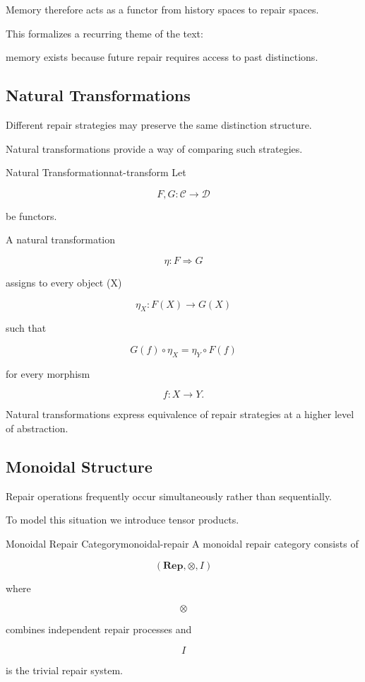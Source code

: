 \documentclass[12pt,twoside,openright]{book}
\begin{document}
Memory therefore acts as a functor from history spaces to
repair spaces.

This formalizes a recurring theme of the text:

memory exists because future repair requires access to
past distinctions.

\subsection{Natural Transformations}

Different repair strategies may preserve the same
distinction structure.

Natural transformations provide a way of comparing such
strategies.

\begin{definition}{Natural Transformation}{nat-transform}
Let

\[
F,G:\mathcal C\rightarrow\mathcal D
\]

be functors.

A natural transformation

\[
\eta:F\Rightarrow G
\]

assigns to every object (X)

\[
\eta_X:F(X)\rightarrow G(X)
\]

such that

\[
G(f)\circ\eta_X
=

\eta_Y\circ F(f)
\]

for every morphism

\[
f:X\rightarrow Y.
\]
\end{definition}

Natural transformations express equivalence of repair
strategies at a higher level of abstraction.

\subsection{Monoidal Structure}

Repair operations frequently occur simultaneously rather
than sequentially.

To model this situation we introduce tensor products.

\begin{definition}{Monoidal Repair Category}{monoidal-repair}
A monoidal repair category consists of

\[
(\mathbf{Rep},\otimes,I)
\]

where

\[
\otimes
\]

combines independent repair processes and

\[
I
\]

is the trivial repair system.
\end{definition}
\end{document}
